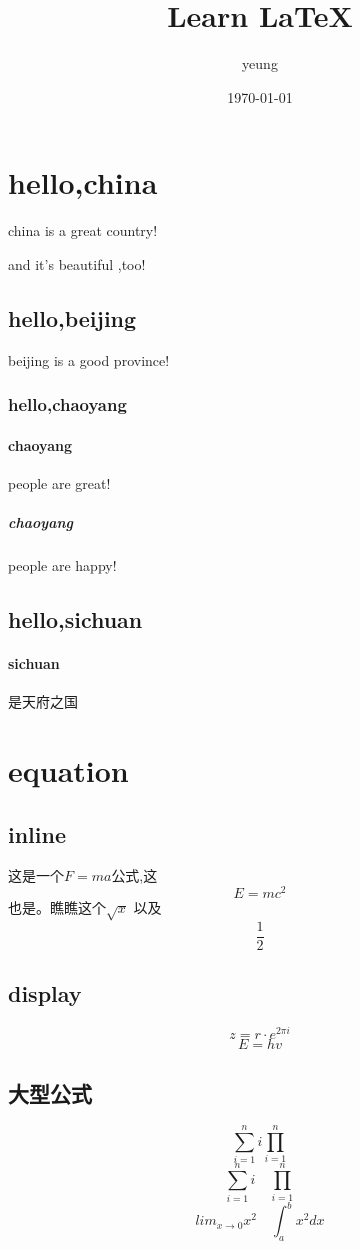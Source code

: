 \documentclass[UTF8]{ctexart}
\title{Learn \LaTeX}
\author{yeung}
\date{\today}
\begin{document}
\maketitle
\tableofcontents
\newpage
\section{hello,china}
china is a great country!

and it's beautiful ,too!
\subsection{hello,beijing}
beijing is a good province!
\subsubsection{hello,chaoyang}
\paragraph{chaoyang}
people are great!
\subparagraph{chaoyang}
people are happy!
\subsection{hello,sichuan}
\paragraph{sichuan}是天府之国
\section{equation}
\subsection{inline}
这是一个$F=ma$公式,这\[E=mc^2\]也是。瞧瞧这个$\sqrt{x}$ 以及\[\frac{1}{2}\]
\subsection{display}
\begin{equation}
z=r\cdot e^{2\pi i}
\end{equation}
\begin{equation}
    E=hv
\end{equation}
\subsection{大型公式}
\[\sum_{i=1}^n i \prod_{i=1}^n \]
\[\sum\limits _{i=1}^n i\quad \prod\limits _{i=1}^n \]
\[lim_{x\to0}x^2 \quad \int_a^b x^2 dx \]
\end{document}
